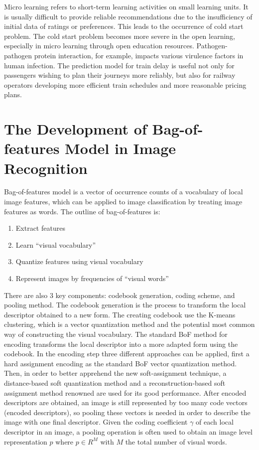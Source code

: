 \documentclass[11pt,en]{elegantpaper}
\begin{document}
Micro learning refers to short-term learning activities on small learning units. It is usually difficult to provide reliable recommendations due to the insufficiency of initial data of ratings or preferences. This leads to the occurrence of cold start problem. The cold start problem becomes more severe in the open learning, especially in micro learning through open education resources. Pathogen-pathogen protein interaction, for example, impacts various virulence factors in human infection. The prediction model for train delay is useful not only for passengers wishing to plan their journeys more reliably, but also for railway operators developing more efficient train schedules and more reasonable pricing plans.
\section{The Development of Bag-of-features Model in Image Recognition}
Bag-of-features model is a vector of occurrence counts of a vocabulary of local image features, which can be applied to image classification by treating image features as words. The outline of bag-of-features is:
\begin{enumerate}
	\item Extract features
	\item Learn “visual vocabulary”
	\item Quantize features using visual vocabulary
	\item Represent images by frequencies of “visual words” 
\end{enumerate}

There are also 3 key components: codebook generation, coding scheme, and pooling method. The codebook generation is the process to transform the local descriptor obtained to a new form. The creating codebook use the K-means clustering, which is a vector quantization method and the potential most common way of constructing the visual vocabulary. The standard BoF method for encoding transforms the local descriptor into a more adapted form using the codebook. In the encoding step three different approaches can be applied, first a hard assignment encoding as the standard BoF vector quantization method. Then, in order to better apprehend the new soft-assignment technique, a distance-based soft quantization method and a reconstruction-based soft assignment method renowned are used for its good performance. After encoded descriptors are obtained, an image is still represented by too many code vectors (encoded descriptors), so pooling these vectors is needed in order to describe the image with one final descriptor. Given the coding coefficient $\gamma$ of each local descriptor in an image, a pooling operation is often used to obtain an image level representation $p$ where $p\in R^M$ with $M$ the total number of visual words.
\end{document}
